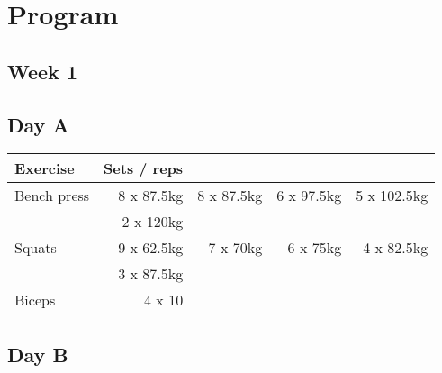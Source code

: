 \documentclass[12pt, a4paper]{article}%
\begin{document}
\clearpage
\section*{Program}
 \subsection*{\hspace{0.25em} Week 1 }
  \subsection*{\hspace{0.5em} Day A }


  \begin{tabular}{l|rrrr}
  \hspace{0.75em} \textbf{Exercise} & \textbf{Sets / reps} \\ \hline

            \hspace{0.75em} Bench press
            & 8 x 87.5kg
            & 8 x 87.5kg
            & 6 x 97.5kg
            & 5 x 102.5kg
            \\


            \hspace{0.75em}
            & 2 x 120kg
            & 
            & 
            & 
            \\


            \hspace{0.75em} Squats
            & 9 x 62.5kg
            & 7 x 70kg
            & 6 x 75kg
            & 4 x 82.5kg
            \\


            \hspace{0.75em}
            & 3 x 87.5kg
            & 
            & 
            & 
            \\


   \hspace{0.75em} Biceps & 4 x 10 \\
  \end{tabular}

  \subsection*{\hspace{0.5em} Day B }
\end{document}
